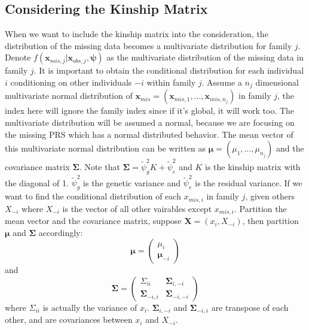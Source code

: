 \documentclass[preprint,12pt]{elsarticle}
\begin{document}
\subsection{Considering the Kinship Matrix}
When we want to include the kinship matrix into the consideration, the distribution of the missing data becomes a multivariate distribution for family $j$. 
Denote $f(\mathbf{x}_{mis,j}|\mathbf{x}_{obs,j},\boldsymbol{\psi})$ as the multivariate distribution of the missing data in family $j$. 
It is important to obtain the conditional distribution for each individual $i$ conditioning on other individuals $-i$ within family $j$. 
Assume a $n_j$ dimensional multivariate normal distribution of $\mathbf{x}_{mis}=(\mathbf{x}_{mis,1}, ...,\mathbf{x}_{mis,n_j})$ in family $j$, the index here will ignore the family index since if it's global, it will work too. 
The multivariate distribution will be assumed a normal, because we are focusing on the missing PRS which has a normal distributed behavior. 
The mean vector of this multivariate normal distribution can be written as $\boldsymbol{\mu}=(\mu_1,...,\mu_{n_j})$ and the covariance matrix $\boldsymbol{\Sigma}$. 
Note that $\boldsymbol{\Sigma}=\tilde{\psi}_g^2K+\tilde{\psi}_e^2$ and $K$ is the kinship matrix with the diagonal of 1. $\tilde{\psi}_g^2$ is the genetic variance and $\tilde{\psi}_e^2$ is the residual variance. 
If we want to find the conditional distribution of each $x_{mis,i}$ in family $j$, given others $X_{-i}$ where $X_{-i}$ is the vector of all other vairables except $x_{mis,i}$. 
Partition the mean vector and the covariance matrix, suppose $\mathbf{X}=(x_i, X_{-i})$, then partition $\boldsymbol{\mu}$ and $\boldsymbol{\Sigma}$ accordingly: 
\begin{equation} 
    \boldsymbol{\mu}=\begin{pmatrix} 
        \mu_i \\
        \boldsymbol{\mu}_{-i}
    \end{pmatrix}
\end{equation}
and 
\begin{equation} 
    \boldsymbol{\Sigma}=\begin{pmatrix} 
        \Sigma_{ii} & \boldsymbol{\Sigma}_{i,-i} \\
        \boldsymbol{\Sigma}_{-i,i} & \boldsymbol{\Sigma}_{-i,-i}
    \end{pmatrix}
\end{equation}
where $\Sigma_{ii}$ is actually the variance of $x_i$.  
$\boldsymbol{\Sigma}_{i,-i}$ and $\boldsymbol{\Sigma}_{-i,i}$ are transpose of each other, and are covariances between $x_i$ and $X_{-i}$. 
\end{document}
